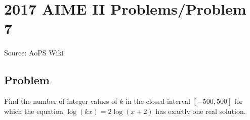 \documentclass[12pt]{article}
\begin{document}
\section*{{2017 AIME II Problems/Problem 7}}
Source: AoPS Wiki

\subsection*{Problem}
Find the number of integer values of $k$ in the closed interval $[-500,500]$ for which the equation $\log(kx)=2\log(x+2)$ has exactly one real solution.
\end{document}
